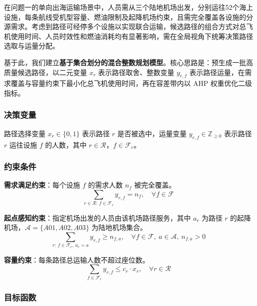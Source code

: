 \documentclass[withoutpreface]{cumcmthesis}
\begin{document}
在问题一的单向出海运输场景中，人员需从三个陆地机场出发，分别运往52个海上设施，每条航线受机型容量、燃油限制及起降机场约束，且需完全覆盖各设施的分源需求。考虑到路径可经停多个设施以实现联合运输，候选路径的组合方式对总飞机使用时间、人员时效性和燃油消耗均有显著影响，需在全局视角下统筹决策路径选取与运量分配。

基于此，我们建立\textbf{基于集合划分的混合整数规划模型}。核心思路是：预生成一批高质量候选路径，以二元变量 $x_r$ 表示路径取舍、整数变量 $y_{r,f}$ 表示路径运量，在需求覆盖与容量约束下最小化总飞机使用时间，再在容差带内以 AHP 权重优化二级指标。

\subsubsection{决策变量}

路径选择变量 $x_r \in \{0, 1\}$ 表示路径 $r$ 是否被选中，运量变量 $y_{r,f} \in \mathbb{Z}_{\geq 0}$ 表示路径 $r$ 运往设施 $f$ 的人数，其中 $r \in \mathcal{R}$，$f \in \mathcal{F}_r$。

\subsubsection{约束条件}

\textbf{需求满足约束}：每个设施 $f$ 的需求人数 $n_f$ 被完全覆盖。
\begin{equation}
\sum_{r \in \mathcal{R}:\, f \in \mathcal{F}_r} y_{r,f} = n_f, \quad \forall f \in \mathcal{F}
\label{eq:q1_demand}
\end{equation}

\textbf{起点感知约束}：指定机场出发的人员由该机场路径服务，其中 $a_r$ 为路径 $r$ 的起降机场，$\mathcal{A}=\{A01, A02, A03\}$ 为陆地机场集合。
\begin{equation}
\sum_{r:\, f \in \mathcal{F}_r,\, a_r = a} y_{r,f} \geq n_{f,a}, \quad \forall f \in \mathcal{F},\ a \in \mathcal{A},\ n_{f,a} > 0
\label{eq:q1_origin}
\end{equation}

\textbf{容量约束}：每条路径总运输人数不超过座位数。
\begin{equation}
\sum_{f \in \mathcal{F}_r} y_{r,f} \leq c_r \cdot x_r, \quad \forall r \in \mathcal{R}
\label{eq:q1_capacity}
\end{equation}

\subsubsection{目标函数}
\end{document}

